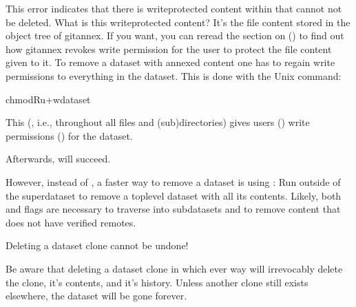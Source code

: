 \sphinxAtStartPar
This error indicates that there is write\sphinxhyphen{}protected content within  that
cannot not be deleted. What is this write\sphinxhyphen{}protected content? It’s the file content
stored in the object tree of git\sphinxhyphen{}annex. If you want, you can re\sphinxhyphen{}read the section on
{\hyperref[\detokenize{basics/101-115-symlinks:symlink}]{}} () to find out how git\sphinxhyphen{}annex revokes write permission for the user
to protect the file content given to it. To remove a dataset with annexed content
one has to regain write permissions to everything in the dataset. This is done
with the Unix  command:

\begin{sphinxVerbatim}[commandchars=\\\{\}]
chmod\PYGZhy{}Ru+w\PYGZlt{}dataset\PYGZgt{}
\end{sphinxVerbatim}

\sphinxAtStartPar
This  (, i.e., throughout all files and (sub)directories) gives users
() write permissions () for the dataset.

\sphinxAtStartPar
Afterwards,  will succeed.

\sphinxAtStartPar
However, instead of , a faster way to remove a dataset is using : Run  outside of the
superdataset to remove a top\sphinxhyphen{}level dataset with all its contents. Likely,
both   and  flags are necessary
to traverse into subdatasets and to remove content that does not have verified remotes.
\begin{importantnote}[before title={\thetcbcounter\ }, check odd page=true]{Deleting a dataset clone cannot be undone!}

\sphinxAtStartPar
Be aware that deleting a dataset clone in which ever way will
irrevocably delete the clone, it’s contents, and it’s history.
Unless another clone still exists elsewhere, the dataset will be gone forever.


\end{importantnote}


